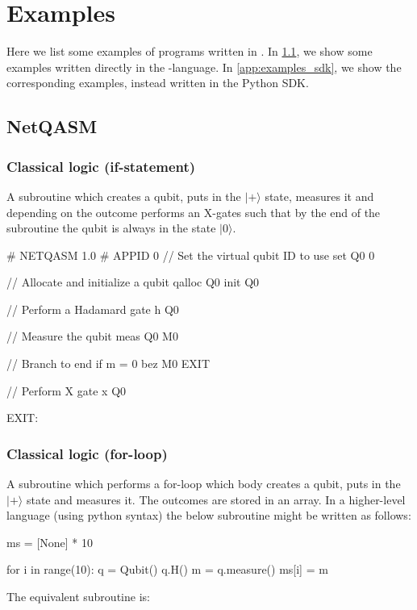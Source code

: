 \section{Examples}
Here we list some examples of programs written in \netqasm.
In \cref{sec:examples_netqasm}, we show some examples written directly in the \netqasm-language.
In \cref{app:examples_sdk}, we show the corresponding examples, instead written in the Python SDK.

\subsection{NetQASM}\label{sec:examples_netqasm}
\subsubsection{Classical logic (if-statement)}\label{sec:example_nq_if}
A subroutine which creates a qubit, puts in the $|+\rangle$ state, measures it and depending on the outcome performs an X-gates such that by the end of the subroutine the qubit is always in the state $|0\rangle$.
\begin{nqcode}
# NETQASM 1.0
# APPID 0
// Set the virtual qubit ID to use
set Q0 0

// Allocate and initialize a qubit
qalloc Q0
init Q0

// Perform a Hadamard gate
h Q0

// Measure the qubit
meas Q0 M0

// Branch to end if m = 0
bez M0 EXIT

// Perform X gate
x Q0

EXIT:\end{nqcode}

\subsubsection{Classical logic (for-loop)}\label{sec:example_nq_for}
A subroutine which performs a for-loop which body creates a qubit, puts in the $|+\rangle$ state and measures it. The outcomes are stored in an array.
In a higher-level language (using python syntax) the below subroutine might be written as follows:
\begin{pycode}
ms = [None] * 10

for i in range(10):
  q = Qubit()
  q.H()
  m = q.measure()
  ms[i] = m
\end{pycode}
The equivalent \netqasm subroutine is:

